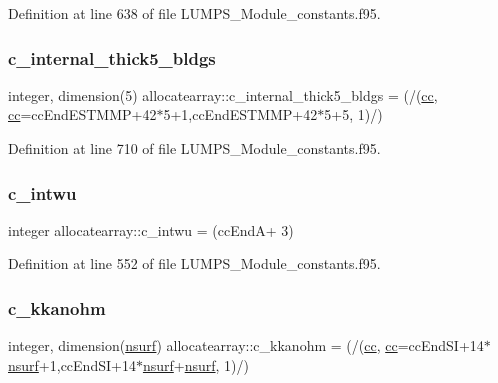 Definition at line 638 of file L\+U\+M\+P\+S\+\_\+\+Module\+\_\+constants.\+f95.

\mbox{\label{namespaceallocatearray_af4fbd7daacbc3f20dc51eae71cce01af}} 
\subsubsection{\texorpdfstring{c\+\_\+internal\+\_\+thick5\+\_\+bldgs}{c\_internal\_thick5\_bldgs}}
{\footnotesize\ttfamily integer, dimension(5) allocatearray\+::c\+\_\+internal\+\_\+thick5\+\_\+bldgs = (/(\hyperlink{namespaceallocatearray_ac863c81704eb507dee10f5e10741e10c}{cc}, \hyperlink{namespaceallocatearray_ac863c81704eb507dee10f5e10741e10c}{cc}=cc\+End\+E\+S\+T\+M\+MP+42$\ast$5+1,cc\+End\+E\+S\+T\+M\+MP+42$\ast$5+5, 1)/)}



Definition at line 710 of file L\+U\+M\+P\+S\+\_\+\+Module\+\_\+constants.\+f95.

\mbox{\label{namespaceallocatearray_a924d021792ec209f52debd87b3b234f7}} 
\subsubsection{\texorpdfstring{c\+\_\+intwu}{c\_intwu}}
{\footnotesize\ttfamily integer allocatearray\+::c\+\_\+intwu = (cc\+EndA+ 3)}



Definition at line 552 of file L\+U\+M\+P\+S\+\_\+\+Module\+\_\+constants.\+f95.

\mbox{\label{namespaceallocatearray_a0d728974695e05ee49baca0830e3f97d}} 
\subsubsection{\texorpdfstring{c\+\_\+kkanohm}{c\_kkanohm}}
{\footnotesize\ttfamily integer, dimension(\hyperlink{namespaceallocatearray_acd22f92a06f7e9a2a91426b3dc99fdb0}{nsurf}) allocatearray\+::c\+\_\+kkanohm = (/(\hyperlink{namespaceallocatearray_ac863c81704eb507dee10f5e10741e10c}{cc}, \hyperlink{namespaceallocatearray_ac863c81704eb507dee10f5e10741e10c}{cc}=cc\+End\+SI+14$\ast$\hyperlink{namespaceallocatearray_acd22f92a06f7e9a2a91426b3dc99fdb0}{nsurf}+1,cc\+End\+SI+14$\ast$\hyperlink{namespaceallocatearray_acd22f92a06f7e9a2a91426b3dc99fdb0}{nsurf}+\hyperlink{namespaceallocatearray_acd22f92a06f7e9a2a91426b3dc99fdb0}{nsurf}, 1)/)}



